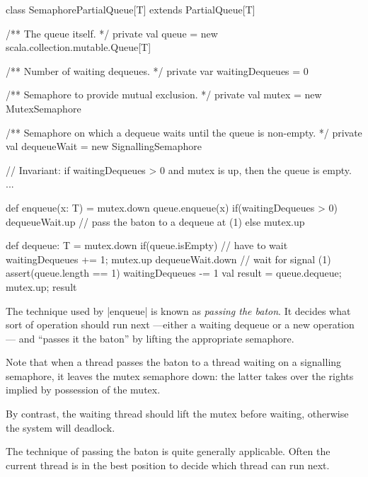 
\begin{slide}

\begin{scala}
class SemaphorePartialQueue[T] extends PartialQueue[T]{
  /** The queue itself. */
  private val queue = new scala.collection.mutable.Queue[T]

  /** Number of waiting dequeues. */
  private var waitingDequeues = 0

  /** Semaphore to provide mutual exclusion. */
  private val mutex = new MutexSemaphore

  /** Semaphore on which a dequeue waits until the queue is non-empty. */
  private val dequeueWait = new SignallingSemaphore

  // Invariant: if waitingDequeues > 0 and mutex is up, then the queue is empty.
  ...
}
\end{scala}
\end{slide}


\begin{slide}

\begin{scala}
  def enqueue(x: T) = {
    mutex.down
    queue.enqueue(x)
    if(waitingDequeues > 0) dequeueWait.up // pass the baton to a dequeue at (1)
    else mutex.up
  }

  def dequeue: T = {
    mutex.down
    if(queue.isEmpty){  // have to wait
      waitingDequeues += 1; mutex.up
      dequeueWait.down                         // wait for signal (1)
      assert(queue.length == 1)
      waitingDequeues -= 1
    }
    val result = queue.dequeue; mutex.up; result
  }
\end{scala}
\end{slide}


\begin{slide}

The technique used by |enqueue| is known as \emph{passing the baton}.  It
decides what sort of operation should run next ---either a waiting dequeue or
a new operation--- and ``passes it the baton'' by lifting the appropriate
semaphore. 

Note that when a thread passes the baton to a thread waiting on a signalling
semaphore, it leaves the mutex semaphore down: the latter takes over the
rights implied by possession of the mutex.  

By contrast, the waiting thread should lift the mutex before waiting,
otherwise the system will deadlock.

The technique of passing the baton is quite generally applicable.  Often the
current thread is in the best position to decide which thread can run next.
\end{slide}

